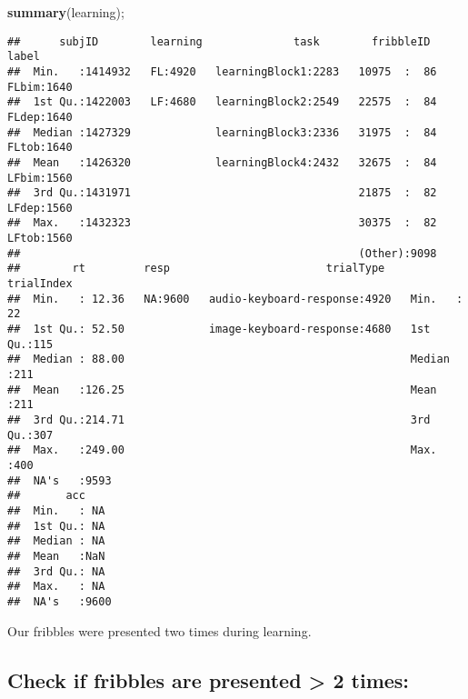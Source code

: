 \documentclass[
]{article}
\newenvironment{Shaded}{\begin{snugshade}}{\end{snugshade}}
\newcommand{\DecValTok}[1]{\textcolor[rgb]{0.00,0.00,0.81}{#1}}
\newcommand{\KeywordTok}[1]{\textcolor[rgb]{0.13,0.29,0.53}{\textbf{#1}}}
\newcommand{\NormalTok}[1]{#1}
\newcommand{\OperatorTok}[1]{\textcolor[rgb]{0.81,0.36,0.00}{\textbf{#1}}}
\newcommand{\StringTok}[1]{\textcolor[rgb]{0.31,0.60,0.02}{#1}}
\begin{document}
\begin{Shaded}
\begin{Highlighting}[]
\KeywordTok{summary}\NormalTok{(learning);}
\end{Highlighting}
\end{Shaded}

\begin{verbatim}
##      subjID        learning              task        fribbleID      label     
##  Min.   :1414932   FL:4920   learningBlock1:2283   10975  :  86   FLbim:1640  
##  1st Qu.:1422003   LF:4680   learningBlock2:2549   22575  :  84   FLdep:1640  
##  Median :1427329             learningBlock3:2336   31975  :  84   FLtob:1640  
##  Mean   :1426320             learningBlock4:2432   32675  :  84   LFbim:1560  
##  3rd Qu.:1431971                                   21875  :  82   LFdep:1560  
##  Max.   :1432323                                   30375  :  82   LFtob:1560  
##                                                    (Other):9098               
##        rt         resp                        trialType      trialIndex 
##  Min.   : 12.36   NA:9600   audio-keyboard-response:4920   Min.   : 22  
##  1st Qu.: 52.50             image-keyboard-response:4680   1st Qu.:115  
##  Median : 88.00                                            Median :211  
##  Mean   :126.25                                            Mean   :211  
##  3rd Qu.:214.71                                            3rd Qu.:307  
##  Max.   :249.00                                            Max.   :400  
##  NA's   :9593                                                           
##       acc      
##  Min.   : NA   
##  1st Qu.: NA   
##  Median : NA   
##  Mean   :NaN   
##  3rd Qu.: NA   
##  Max.   : NA   
##  NA's   :9600
\end{verbatim}

Our fribbles were presented two times during learning.

\hypertarget{check-if-fribbles-are-presented-2-times}{%
\subsection{Check if fribbles are presented \textgreater{} 2
times:}\label{check-if-fribbles-are-presented-2-times}}

\begin{Shaded}
\end{Shaded}
\end{document}
